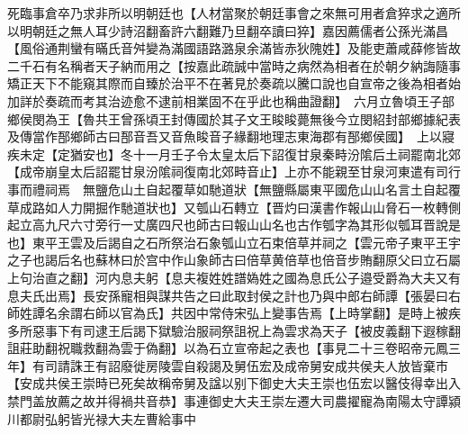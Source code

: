 死臨事倉卒乃求非所以明朝廷也【人材當聚於朝廷事會之來無可用者倉猝求之適所以明朝廷之無人耳少詩沼翻畜許六翻難乃旦翻卒讀曰猝】嘉因薦儒者公孫光滿昌【風俗通荆蠻有暪氏音舛變為滿國語路潞泉余滿皆赤狄隗姓】及能吏蕭咸薛修皆故二千石有名稱者天子納而用之【按嘉此疏誠中當時之病然為相者在於朝夕納誨隨事矯正天下不能窺其際而自臻於治平不在著見於奏疏以騰口說也自宣帝之後為相者始加詳於奏疏而考其治迹愈不逮前相業固不在乎此也稱曲證翻】　六月立魯頃王子部鄉侯閔為王【魯共王曾孫頃王封傳國於其子文王睃睃薨無後今立閔紹封部鄉據紀表及傳當作郚鄉師古曰郚音吾又音魚睃音子緣翻地理志東海郡有郚鄉侯國】　上以寢疾未定【定猶安也】冬十一月壬子令太皇太后下詔復甘泉秦畤汾隂后土祠罷南北郊【成帝崩皇太后詔罷甘泉汾隂祠復南北郊畤音止】上亦不能親至甘泉河東遣有司行事而禮祠焉　無鹽危山土自起覆草如馳道狀【無鹽縣屬東平國危山山名言土自起覆草成路如人力開掘作馳道狀也】又瓠山石轉立【晋灼曰漢書作報山山脅石一枚轉側起立高九尺六寸旁行一丈廣四尺也師古曰報山山名也古作瓠字為其形似瓠耳晋說是也】東平王雲及后謁自之石所祭治石象瓠山立石束倍草并祠之【雲元帝子東平王宇之子也謁后名也蘇林曰於宫中作山象師古曰倍草黄倍草也倍音步賄翻原父曰立石屬上句治直之翻】河内息夫躬【息夫複姓姓譜媯姓之國為息氏公子邉受爵為大夫又有息夫氏出焉】長安孫寵相與謀共告之曰此取封侯之計也乃與中郎右師譚【張晏曰右師姓譚名余謂右師以官為氏】共因中常侍宋弘上變事告焉【上時掌翻】是時上被疾多所惡事下有司逮王后謁下獄驗治服祠祭詛祝上為雲求為天子【被皮義翻下遐稼翻詛莊助翻祝職救翻為雲于偽翻】以為石立宣帝起之表也【事見二十三卷昭帝元鳳三年】有司請誅王有詔廢徙房陵雲自殺謁及舅伍宏及成帝舅安成共侯夫人放皆棄市【安成共侯王崇時已死矣故稱帝舅及諡以别下御史大夫王崇也伍宏以醫伎得幸出入禁門盖放薦之故并得禍共音恭】事連御史大夫王崇左遷大司農擢寵為南陽太守譚潁川都尉弘躬皆光禄大夫左曹給事中

